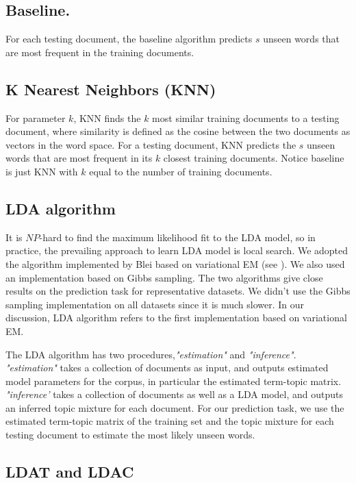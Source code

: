 \subsection{Baseline.}
For each testing document, the baseline algorithm predicts $s$ unseen words that are most frequent in the training documents.
\subsection{K Nearest Neighbors (KNN)}

For parameter $k$, KNN finds the $k$ most similar training documents
to a testing document, where similarity is defined as the cosine
between the two documents as vectors in the word space. For a testing
document, KNN predicts the $s$ unseen words that are most frequent in
its $k$ closest training documents. Notice baseline is just KNN with
$k$ equal to the number of training documents.

\subsection{LDA algorithm}
It is $NP$-hard to find the maximum likelihood fit to the LDA model,
so in practice, the prevailing approach to learn LDA model is local
search. We adopted the algorithm implemented by Blei \cite{LDAcode}
based on variational EM (see \cite{Blei2003a}). We also used an
implementation \cite{GibbsLDA} based on Gibbs sampling. The two
algorithms give close results on the prediction task for
representative datasets. We didn't use the Gibbs sampling
implementation on all datasets since it is much slower. In our
discussion, LDA algorithm refers to the first implementation based on
variational EM.

The LDA algorithm has two procedures,{\em "estimation"} and {\em
  "inference"}. {\em "estimation"} takes a collection of documents as
input, and outputs estimated model parameters for the corpus, in
particular the estimated term-topic matrix. {\em "inference'} takes a
collection of documents as well as a LDA model, and outputs an
inferred topic mixture for each document. For our prediction task, we
use the estimated term-topic matrix of the training set and the topic
mixture for each testing document to estimate the most likely unseen
words.

\subsection{LDAT and LDAC}

